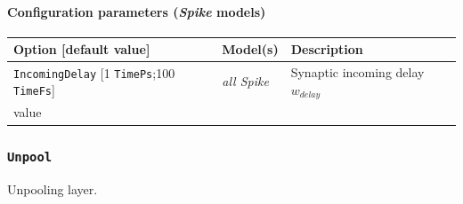 \documentclass[a4paper,11pt,oneside]{article}
\begin{document}
\paragraph{Configuration parameters (\emph{Spike} models)}

\begin{center}
 \begin{longtable}{| p{4cm} | p{3cm} | p{9cm} | }
 \hline
 Option [default value] & Model(s) & Description\\
 \hline\hline
  \lstinline!IncomingDelay! [1 \lstinline!TimePs!;100 \lstinline!TimeFs!]
    & \emph{all Spike} & Synaptic incoming delay $w_{delay}$ \\value \\
 \hline
\end{longtable}
\end{center}


\subsubsection{\texorpdfstring{%
\lstinline[basicstyle=\ttfamily\bfseries]!Unpool!}{Unpool}}
Unpooling layer.
\end{document}
